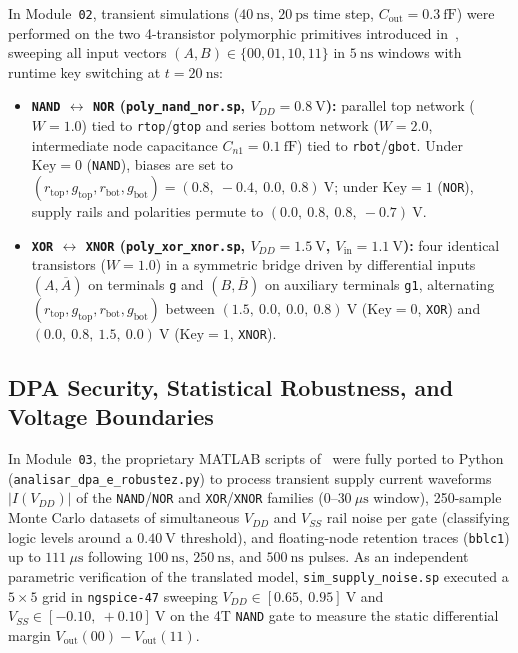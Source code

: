 In Module~\texttt{02}, transient simulations ($40\ \text{ns}$, $20\ \text{ps}$ time step, $C_{\mathrm{out}} = 0.3\ \text{fF}$) were performed on the two 4-transistor polymorphic primitives introduced in~\cite{wu2020reconfigurable}, sweeping all input vectors $(A,B) \in \{00, 01, 10, 11\}$ in $5\ \text{ns}$ windows with runtime key switching at $t = 20\ \text{ns}$:
\begin{itemize}
    \item \textbf{\texttt{NAND} $\leftrightarrow$ \texttt{NOR} (\texttt{poly\_nand\_nor.sp}, $V_{DD} = 0.8\ \text{V}$):} parallel top network ($W=1.0$) tied to \texttt{rtop}/\texttt{gtop} and series bottom network ($W=2.0$, intermediate node capacitance $C_{n1}=0.1\ \text{fF}$) tied to \texttt{rbot}/\texttt{gbot}. Under $\text{Key}=0$ (\texttt{NAND}), biases are set to $(r_{\mathrm{top}}, g_{\mathrm{top}}, r_{\mathrm{bot}}, g_{\mathrm{bot}}) = (0.8,\ -0.4,\ 0.0,\ 0.8)\ \text{V}$; under $\text{Key}=1$ (\texttt{NOR}), supply rails and polarities permute to $(0.0,\ 0.8,\ 0.8,\ -0.7)\ \text{V}$.
    \item \textbf{\texttt{XOR} $\leftrightarrow$ \texttt{XNOR} (\texttt{poly\_xor\_xnor.sp}, $V_{DD} = 1.5\ \text{V}$, $V_{\mathrm{in}} = 1.1\ \text{V}$):} four identical transistors ($W=1.0$) in a symmetric bridge driven by differential inputs $(A,\overline{A})$ on terminals \texttt{g} and $(B,\overline{B})$ on auxiliary terminals \texttt{g1}, alternating $(r_{\mathrm{top}}, g_{\mathrm{top}}, r_{\mathrm{bot}}, g_{\mathrm{bot}})$ between $(1.5,\ 0.0,\ 0.0,\ 0.8)\ \text{V}$ ($\text{Key}=0$, \texttt{XOR}) and $(0.0,\ 0.8,\ 1.5,\ 0.0)\ \text{V}$ ($\text{Key}=1$, \texttt{XNOR}).
\end{itemize}

\subsection{DPA Security, Statistical Robustness, and Voltage Boundaries}\label{sec:met_dpa_boundary}

In Module~\texttt{03}, the proprietary MATLAB scripts of~\cite{wu2020reconfigurable} were fully ported to Python (\texttt{analisar\_\allowbreak dpa\_\allowbreak e\_\allowbreak robustez.py}) to process transient supply current waveforms $|I(V_{DD})|$ of the \texttt{NAND}/\texttt{NOR} and \texttt{XOR}/\texttt{XNOR} families ($0\text{--}30\ \mu\text{s}$ window), 250-sample Monte Carlo datasets of simultaneous $V_{DD}$ and $V_{SS}$ rail noise per gate (classifying logic levels around a $0.40\ \text{V}$ threshold), and floating-node retention traces (\texttt{bblc1}) up to $111\ \mu\text{s}$ following $100\ \text{ns}$, $250\ \text{ns}$, and $500\ \text{ns}$ pulses. As an independent parametric verification of the translated model, \texttt{sim\_\allowbreak supply\_\allowbreak noise.sp} executed a $5 \times 5$ grid in \texttt{ngspice-47} sweeping $V_{DD} \in [0.65,\ 0.95]\ \text{V}$ and $V_{SS} \in [-0.10,\ +0.10]\ \text{V}$ on the 4T \texttt{NAND} gate to measure the static differential margin $V_{\mathrm{out}}(00) - V_{\mathrm{out}}(11)$.

